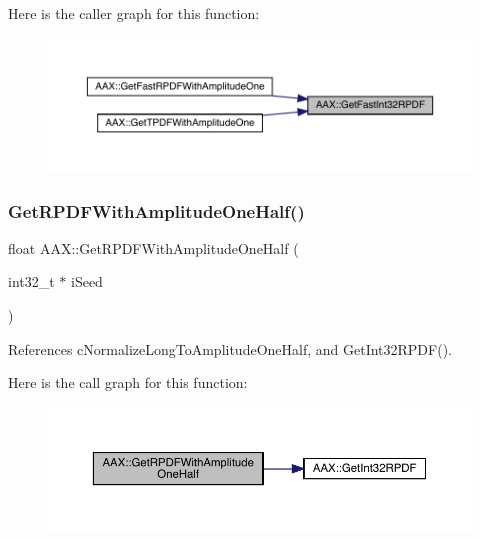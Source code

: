 Here is the caller graph for this function\+:
\nopagebreak
\begin{figure}[H]
\begin{center}
\leavevmode
\includegraphics[width=350pt]{a00852_ad12251899137d551b9f652b1ffee2f99_icgraph}
\end{center}
\end{figure}
\mbox{\label{a00852_a5a91375167236862abc93ad879639cab}} 
\subsubsection{\texorpdfstring{GetRPDFWithAmplitudeOneHalf()}{GetRPDFWithAmplitudeOneHalf()}}
{\footnotesize\ttfamily float A\+A\+X\+::\+Get\+R\+P\+D\+F\+With\+Amplitude\+One\+Half (\begin{DoxyParamCaption}\item[{int32\+\_\+t $\ast$}]{i\+Seed }\end{DoxyParamCaption})\hspace{0.3cm}{\ttfamily [inline]}}



References c\+Normalize\+Long\+To\+Amplitude\+One\+Half, and Get\+Int32\+R\+P\+D\+F().

Here is the call graph for this function\+:
\nopagebreak
\begin{figure}[H]
\begin{center}
\leavevmode
\includegraphics[width=350pt]{a00852_a5a91375167236862abc93ad879639cab_cgraph}
\end{center}
\end{figure}
\mbox{\label{a00852_a51d7a263d9053276c6cef1dbd2018ebe}} 
